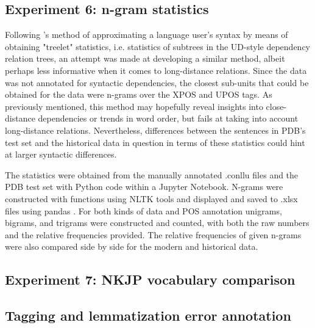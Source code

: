 \subsection{Experiment 6: n-gram statistics}
\label{subsec:ngrams}

Following \citet{johannsen-etal-2015-cross}'s method of approximating a language user's syntax by means of obtaining "treelet" statistics, i.e. statistics of subtrees in the UD-style dependency relation trees, an attempt was made at developing a similar method, albeit perhaps less informative when it comes to long-distance relations. Since the data was not annotated for syntactic dependencies, the closest sub-units that could be obtained for the data were n-grams over the XPOS and UPOS tags. As previously mentioned, this method may hopefully reveal insights into close-distance dependencies or trends in word order, but fails at taking into account long-distance relations. Nevertheless, differences between the sentences in PDB's test set and the historical data in question in terms of these statistics could hint at larger syntactic differences.

The statistics were obtained from the manually annotated .conllu files and the PDB test set with Python code within a Jupyter Notebook. N-grams were constructed with functions using NLTK tools and displayed and saved to .xlsx files using pandas \citep{bird_loper_klein_2009, reback2020pandas, mckinney-proc-scipy-2010}. For both kinds of data and POS annotation unigrams, bigrams, and trigrams were constructed and counted, with both the raw numbers and the relative frequencies provided. The relative frequencies of given n-grams were also compared side by side for the modern and historical data.

\subsection{Experiment 7: NKJP vocabulary comparison}
\label{subsec:nkjp-vocab}
\subsection{Tagging and lemmatization error annotation}
\label{subsec:error-annotation}
